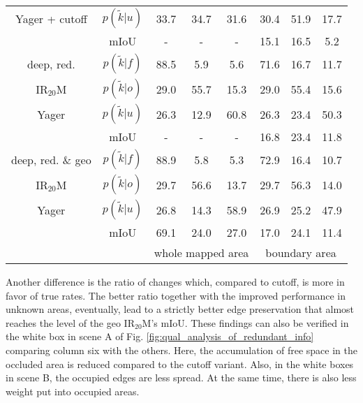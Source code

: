 \begin{center}
\begin{tabular}{c|c|ccc|ccc}
		Yager + cutoff&$p(\tilde{k}|u)$ & 33.7 & 34.7 & 31.6& 30.4 & 51.9 & 17.7 \\
		& mIoU & - & - & - &15.1&16.5&5.2 \\			
		\hline
		deep, red.&$p(\tilde{k}|f)$ & \textcolor{mygreen}{88.5} & \textcolor{myred}{5.9} & 5.6& \textcolor{mygreen}{71.6} & \textcolor{myred}{16.7} & 11.7 \\
		IR$_{20}$M&$p(\tilde{k}|o)$ & \textcolor{myred}{29.0} & \textcolor{mygreen}{55.7} & 15.3& \textcolor{myred}{29.0} & \textcolor{mygreen}{55.4} & 15.6 \\
		Yager&$p(\tilde{k}|u)$ & 26.3 & 12.9 & 60.8& 26.3 & 23.4 & 50.3 \\
		& mIoU & - & - & - &16.8&23.4&11.8 \\
		\hline
		deep, red. \& geo&$p(\tilde{k}|f)$ & \textcolor{mygreen}{88.9} & \textcolor{myred}{5.8} & 5.3& \textcolor{mygreen}{72.9} & \textcolor{myred}{16.4} & 10.7 \\
		IR$_{20}$M&$p(\tilde{k}|o)$ & \textcolor{myred}{29.7} & \textcolor{mygreen}{56.6} & 13.7& \textcolor{myred}{29.7} & \textcolor{mygreen}{56.3} & 14.0 \\
		Yager&$p(\tilde{k}|u)$ & 26.8 & 14.3 & 58.9& 26.9 & 25.2 & 47.9 \\
		& mIoU &69.1&24.0&27.0&17.0&24.1&11.4 \\
		\hline
		& & \multicolumn{3}{c|}{whole mapped area} & \multicolumn{3}{c}{boundary area}
	\end{tabular}
\end{center}
Another difference is the ratio of changes which, compared to cutoff, is more in favor of true rates. The better ratio together with the improved performance in unknown areas, eventually, lead to a strictly better edge preservation that almost reaches the level of the geo IR$_{20}$M's mIoU. These findings can also be verified in the white box in scene A of Fig. \ref{fig:qual_analysis_of_redundant_info} comparing column six with the others. Here, the accumulation of free space in the occluded area is reduced compared to the cutoff variant. Also, in the white boxes in scene B, the occupied edges are less spread. At the same time, there is also less weight put into occupied areas.
\\\\
